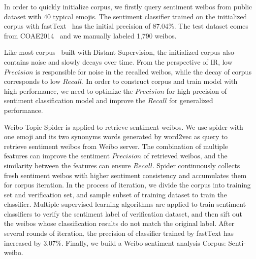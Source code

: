 \documentclass[runningheads]{llncs}
\begin{document}
In order to quickly initialize corpus, we firstly query sentiment weibos from public dataset with 40 typical emojis. The sentiment classifier trained on the initialized corpus with fastText~\cite{joulin2016bag} has the initial precision of 87.04\%. The test dataset comes from COAE2014~\cite{Yang2015Task} and we manually labeled 1,790 weibos.

Like most corpus~\cite{go2009twitter,iosifidis2017large} built with Distant Supervision, the initialized corpus also contains noise and slowly decays over time. From the perspective of IR, low $Precision$ is responsible for noise in the recalled weibos, while the decay of corpus corresponds to low $Recall$. In order to construct corpus and train model with high performance, we need to optimize the $Precision$ for high precision of sentiment classification model and improve the $Recall$ for generalized performance.


Weibo Topic Spider is applied to retrieve sentiment weibos. We use spider with one emoji and its two synonyms words generated by word2vec as query to retrieve sentiment weibos from Weibo server. The combination of multiple features can improve the sentiment $Precision$ of retrieved weibos, and the similarity between the features can ensure $Recall$. Spider continuously collects fresh sentiment weibos with higher sentiment consistency and accumulates them for corpus iteration. In the process of iteration, we divide the corpus into training set and verification set, and sample subset of training dataset to train the classifier. Multiple supervised learning algorithms are applied to train sentiment classifiers to verify the sentiment label of verification dataset, and then sift out the weibos whose classification results do not match the original label. After several rounds of iteration, the precision of classifier trained by fastText has increased by 3.07\%. Finally, we build a Weibo sentiment analysis Corpus: Senti-weibo. 
\end{document}
